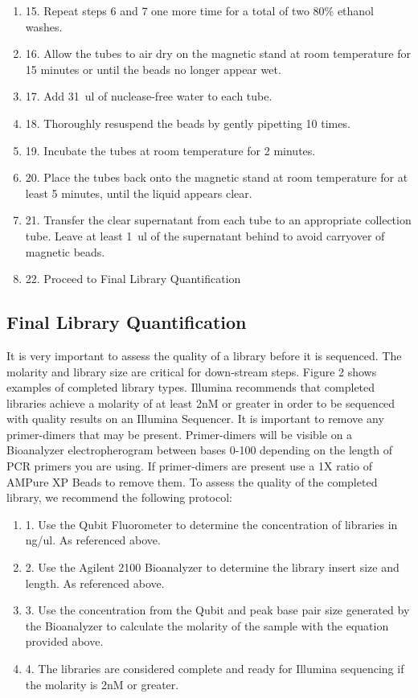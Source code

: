\documentclass[graybox]{svmult}
\begin{document}
\begin{enumerate}
\item{15.     Repeat steps 6 and 7 one more time for a total of two 80\% ethanol washes.}
\item{16.     Allow the tubes to air dry on the magnetic stand at room temperature for 15 minutes or until the beads no longer appear wet.}
\item{17.     Add 31~ul of nuclease-free water to each tube.}
\item{18.     Thoroughly resuspend the beads by gently pipetting 10 times.}
\item{19.     Incubate the tubes at room temperature for 2 minutes.}
\item{20.     Place the tubes back onto the magnetic stand at room temperature for at least 5 minutes, until the liquid appears clear.}
\item{21.     Transfer the clear supernatant from each tube to an appropriate collection tube. Leave at least 1~ul of the supernatant behind to avoid carryover of magnetic beads.}
\item{22.     Proceed to Final Library Quantification}

\end{enumerate}

\subsection{Final Library Quantification}

It is very important to assess the quality of a library before it is sequenced. The molarity and library size are critical for down-stream steps. Figure 2 shows examples of completed library types. Illumina recommends that completed libraries achieve a molarity of at least 2nM or greater in order to be sequenced with quality results on an Illumina Sequencer. It is important to remove any primer-dimers that may be present. Primer-dimers will be visible on a Bioanalyzer electropherogram between bases 0-100 depending on the length of PCR primers you are using. If primer-dimers are present use a 1X ratio of AMPure XP Beads to remove them. To assess the quality of the completed library, we recommend the following protocol:
\begin{enumerate}
\item{1.      Use the Qubit Fluorometer to determine the concentration of libraries in ng/ul. As referenced above.}
\item{2.      Use the Agilent 2100 Bioanalyzer to determine the library insert size and length. As referenced above.}
\item{3.      Use the concentration from the Qubit and peak base pair size generated by the Bioanalyzer to calculate the molarity of the sample with the equation provided above.}
\item{4.      The libraries are considered complete and ready for Illumina sequencing if the molarity is 2nM or greater.}
\end{enumerate}
\end{document}
